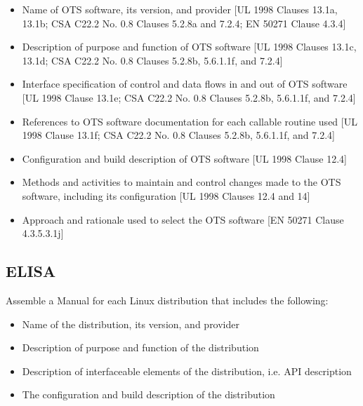 \documentclass[12pt]{../Common_files/ElisaPaper}
\begin{document}
\begin{itemize}

\item Name of OTS software, its version, and provider [UL 1998 \cite{UL1998} Clauses 13.1a, 13.1b; CSA C22.2 No. 0.8 \cite{CSA0.8} Clauses 5.2.8a and 7.2.4; EN 50271 \cite{EN50271} Clause 4.3.4]

\item Description of purpose and function of OTS software [UL 1998 \cite{UL1998} Clauses 13.1c, 13.1d; CSA C22.2 No. 0.8 \cite{CSA0.8} Clauses 5.2.8b, 5.6.1.1f, and 7.2.4]

\item Interface specification of control and data flows in and out of OTS software [UL 1998 \cite{UL1998} Clause 13.1e; CSA C22.2 No. 0.8 \cite{CSA0.8} Clauses 5.2.8b, 5.6.1.1f, and 7.2.4]

\item References to OTS software documentation for each callable routine used [UL 1998 \cite{UL1998} Clause 13.1f; CSA C22.2 No. 0.8 \cite{CSA0.8} Clauses 5.2.8b, 5.6.1.1f, and 7.2.4]

\item Configuration and build description of OTS software [UL 1998 \cite{UL1998} Clause 12.4]

\item Methods and activities to maintain and control changes made to the OTS software, including its configuration [UL 1998 \cite{UL1998} Clauses 12.4 and 14]

\item Approach and rationale used to select the OTS software [EN 50271 \cite{EN50271} Clause 4.3.5.3.1j]

\end{itemize}

\subsection{ELISA}
Assemble a Manual for each Linux distribution that includes the following:

\begin{itemize}

\item Name of the distribution, its version, and provider

\item Description of purpose and function of the distribution 

\item Description of interfaceable elements of the distribution, i.e. API description

\item The configuration and build description of the distribution

\end{itemize}
\end{document}
